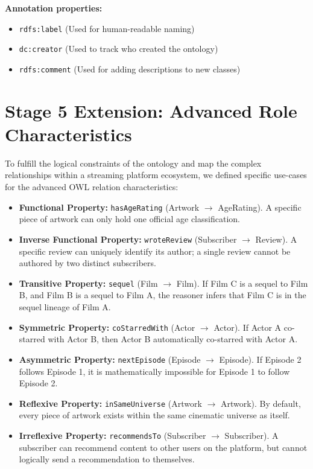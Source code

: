 \vspace{0.5cm}
\noindent\textbf{Annotation properties:}
\begin{itemize}
    \item \texttt{rdfs:label} (Used for human-readable naming)
    \item \texttt{dc:creator} (Used to track who created the ontology)
    \item \texttt{rdfs:comment} (Used for adding descriptions to new classes)
\end{itemize}

\section*{Stage 5 Extension: Advanced Role Characteristics}
To fulfill the logical constraints of the ontology and map the complex relationships within a streaming platform ecosystem, we defined specific use-cases for the advanced OWL relation characteristics:

\begin{itemize}
    \item \textbf{Functional Property:} \texttt{hasAgeRating} (Artwork $\rightarrow$ AgeRating). A specific piece of artwork can only hold one official age classification.
    \item \textbf{Inverse Functional Property:} \texttt{wroteReview} (Subscriber $\rightarrow$ Review). A specific review can uniquely identify its author; a single review cannot be authored by two distinct subscribers.
    \item \textbf{Transitive Property:} \texttt{sequel} (Film $\rightarrow$ Film). If Film C is a sequel to Film B, and Film B is a sequel to Film A, the reasoner infers that Film C is in the sequel lineage of Film A.
    \item \textbf{Symmetric Property:} \texttt{coStarredWith} (Actor $\rightarrow$ Actor). If Actor A co-starred with Actor B, then Actor B automatically co-starred with Actor A.
    \item \textbf{Asymmetric Property:} \texttt{nextEpisode} (Episode $\rightarrow$ Episode). If Episode 2 follows Episode 1, it is mathematically impossible for Episode 1 to follow Episode 2.
    \item \textbf{Reflexive Property:} \texttt{inSameUniverse} (Artwork $\rightarrow$ Artwork). By default, every piece of artwork exists within the same cinematic universe as itself.
    \item \textbf{Irreflexive Property:} \texttt{recommendsTo} (Subscriber $\rightarrow$ Subscriber). A subscriber can recommend content to other users on the platform, but cannot logically send a recommendation to themselves.
\end{itemize}